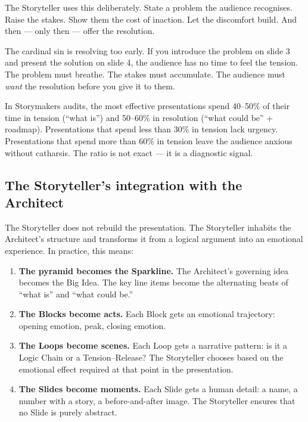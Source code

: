 The Storyteller uses this deliberately. State a problem the audience recognises. Raise the stakes. Show them the cost of inaction. Let the discomfort build. And then --- only then --- offer the resolution.

The cardinal sin is resolving too early. If you introduce the problem on slide 3 and present the solution on slide 4, the audience has no time to feel the tension. The problem must breathe. The stakes must accumulate. The audience must \emph{want} the resolution before you give it to them.

\begin{insightbox}
In Storymakers audits, the most effective presentations spend 40--50\% of their time in tension (``what is'') and 50--60\% in resolution (``what could be'' + roadmap). Presentations that spend less than 30\% in tension lack urgency. Presentations that spend more than 60\% in tension leave the audience anxious without catharsis. The ratio is not exact --- it is a diagnostic signal.
\end{insightbox}

\subsection{The Storyteller's integration with the Architect}

The Storyteller does not rebuild the presentation. The Storyteller inhabits the Architect's structure and transforms it from a logical argument into an emotional experience. In practice, this means:

\begin{enumerate}
  \item \textbf{The pyramid becomes the Sparkline.} The Architect's governing idea becomes the Big Idea. The key line items become the alternating beats of ``what is'' and ``what could be.''
  \item \textbf{The Blocks become acts.} Each Block gets an emotional trajectory: opening emotion, peak, closing emotion.
  \item \textbf{The Loops become scenes.} Each Loop gets a narrative pattern: is it a Logic Chain or a Tension--Release? The Storyteller chooses based on the emotional effect required at that point in the presentation.
  \item \textbf{The Slides become moments.} Each Slide gets a human detail: a name, a number with a story, a before-and-after image. The Storyteller ensures that no Slide is purely abstract.
\end{enumerate}

